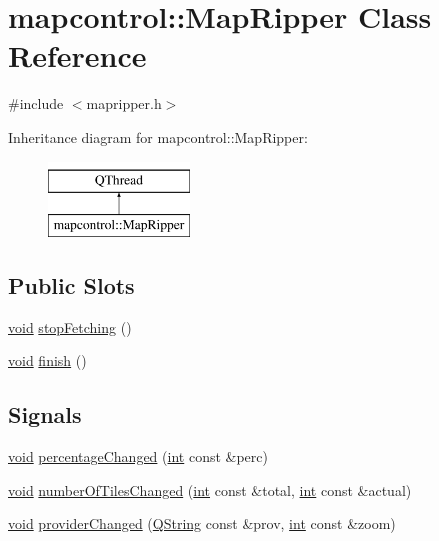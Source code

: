 \hypertarget{classmapcontrol_1_1_map_ripper}{\section{mapcontrol\-:\-:Map\-Ripper Class Reference}
\label{classmapcontrol_1_1_map_ripper}
}


{\ttfamily \#include $<$mapripper.\-h$>$}

Inheritance diagram for mapcontrol\-:\-:Map\-Ripper\-:\begin{figure}[H]
\begin{center}
\leavevmode
\includegraphics[height=2.000000cm]{classmapcontrol_1_1_map_ripper}
\end{center}
\end{figure}
\subsection*{Public Slots}
\begin{DoxyCompactItemize}
\item 
\hyperlink{group___u_a_v_objects_plugin_ga444cf2ff3f0ecbe028adce838d373f5c}{void} \hyperlink{group___o_p_map_widget_ga0419a5b1b5c4fef8c6344c8a29320cb7}{stop\-Fetching} ()
\item 
\hyperlink{group___u_a_v_objects_plugin_ga444cf2ff3f0ecbe028adce838d373f5c}{void} \hyperlink{group___o_p_map_widget_ga137eaecaa016ae12f23b3638657fe797}{finish} ()
\end{DoxyCompactItemize}
\subsection*{Signals}
\begin{DoxyCompactItemize}
\item 
\hyperlink{group___u_a_v_objects_plugin_ga444cf2ff3f0ecbe028adce838d373f5c}{void} \hyperlink{group___o_p_map_widget_ga49c16d8dabea46c8afafb51521e2428b}{percentage\-Changed} (\hyperlink{ioapi_8h_a787fa3cf048117ba7123753c1e74fcd6}{int} const \&perc)
\item 
\hyperlink{group___u_a_v_objects_plugin_ga444cf2ff3f0ecbe028adce838d373f5c}{void} \hyperlink{group___o_p_map_widget_ga5e1cd3587aa324cbf448b05771ef51c8}{number\-Of\-Tiles\-Changed} (\hyperlink{ioapi_8h_a787fa3cf048117ba7123753c1e74fcd6}{int} const \&total, \hyperlink{ioapi_8h_a787fa3cf048117ba7123753c1e74fcd6}{int} const \&actual)
\item 
\hyperlink{group___u_a_v_objects_plugin_ga444cf2ff3f0ecbe028adce838d373f5c}{void} \hyperlink{group___o_p_map_widget_ga19cc407500250e1c43e975e30ea90112}{provider\-Changed} (\hyperlink{group___u_a_v_objects_plugin_gab9d252f49c333c94a72f97ce3105a32d}{Q\-String} const \&prov, \hyperlink{ioapi_8h_a787fa3cf048117ba7123753c1e74fcd6}{int} const \&zoom)
\end{DoxyCompactItemize}
